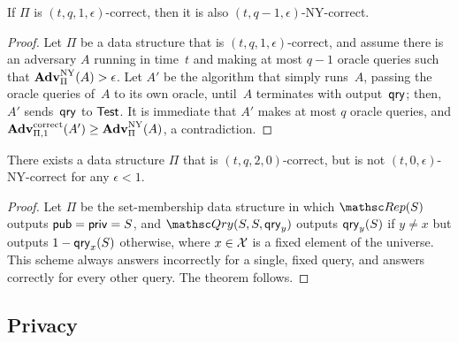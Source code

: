 \begin{theorem}
If $\Pi$ is $(t, q, 1, \epsilon)$-correct, then it is also $(t, q-1, \epsilon)$-NY-correct.
\end{theorem}

\begin{proof}
Let $\Pi$ be a data structure that is $(t,q,1,\epsilon)$-correct,
and assume
there is an adversary $A$ running in time~$t$
and making at most $q-1$ oracle queries such that
$\mathrm{\mathbf{Adv}}^{\mathrm{NY}}_{\Pi}(A) > \epsilon$.
Let $A'$ be the algorithm that simply
runs~$A$, passing the oracle queries of~$A$ to its own oracle, until~$A$ terminates
with output~$\mathsf{qry}$; then, $A'$ sends~$\mathsf{qry}$ to $\mathsf{Test}$. It is immediate that $A'$ makes at most $q$ oracle queries, and
$\mathrm{\mathbf{Adv}}^{\mathrm{correct}}_{\Pi,1}(A') \geq \mathrm{\mathbf{Adv}}^{\mathrm{NY}}_{\Pi}(A)$, a contradiction.
\end{proof}

\begin{theorem}
There exists a data structure $\Pi$ that
is $(t, q, 2, 0)$-correct, but is not $(t, 0, \epsilon)$-NY-correct
for any $\epsilon<1$.
\end{theorem}
\begin{proof}
Let $\Pi$ be the set-membership data structure in which $\Rep(S)$ outputs
${\sf pub}={\sf priv}=S$, and
$\Qry(S, S, \qry_y)$ outputs $\mathsf{qry}_y(S)$ if $y \neq x$ but outputs $1-\mathsf{qry}_x(S)$ otherwise,
where $x \in {\cal X}$ is a fixed element of the universe. This
scheme always answers incorrectly for a single, fixed query, and answers
correctly for every other query. The theorem follows.
\end{proof}

  


\newcommand{\leak}{{\sf leak}}
\subsection{Privacy}

